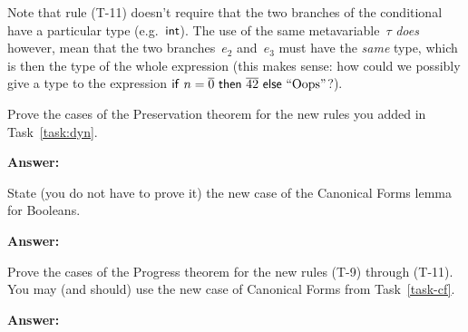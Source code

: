 \documentclass{article}
\begin{document}
{
  \centering
  \def \MathparLineskip {\lineskip=0.43cm}
}

Note that rule (T-11) doesn't require that the two branches of the conditional
have a particular type (e.g.~$\mathsf{int}$).
%
The use of the same metavariable~$\tau$ {\em does} however, mean that the
two branches~$e_2$ and~$e_3$ must have the {\em same} type, which is then the
type of the whole expression
(this makes sense: how could we possibly give a type to the expression
$\mathsf{if}~n = \overline{0}~\mathsf{then}~\overline{42}~\mathsf{else}~\text{``}\text{Oops}\text{''}$?).

\begin{task}
  Prove the cases of the Preservation theorem for the new rules you
  added in Task~\ref{task:dyn}.
\end{task}

\textbf{Answer:}

\begin{task}\label{task-cf}
  State (you do not have to prove it) the new case of the Canonical Forms
  lemma for Booleans.
\end{task}

\textbf{Answer:}

\begin{task}
  Prove the cases of the Progress theorem for the new rules
  (T-9) through (T-11). You may (and should) use the new case of Canonical
  Forms from Task~\ref{task-cf}.
\end{task}

\textbf{Answer:}
\end{document}
